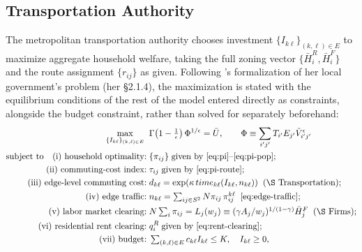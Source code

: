 \documentclass[12pt, a4paper]{article}
\theoremstyle{definition}
\theoremstyle{remark}
\begin{document}
\subsection{Transportation Authority}

The metropolitan transportation authority chooses investment $\{I_{k\ell}\}_{(k,\ell) \in E}$ to maximize aggregate household welfare, taking the full zoning vector $\{\bar{H}_i^R, \bar{H}_i^F\}$ and the route assignment $\{r_{ij}\}$ as given. Following \citet{Bordeu2026-df}'s formalization of her local government's problem (her \S2.1.4), the maximization is stated with the equilibrium conditions of the rest of the model entered directly as constraints, alongside the budget constraint, rather than solved for separately beforehand:
\begin{align}
    \label{eq:TA-problem}
\max_{\{I_{k\ell}\}_{(k,\ell)\in E}}\;\; & \Gamma\!\left(1 - \tfrac{1}{\epsilon}\right)\Phi^{1/\epsilon} = \bar U, \qquad \Phi\equiv\sum_{i'j'}T_{i'}E_{j'}\tilde V_{i'j'}^\epsilon \\
\text{subject to} \quad
\text{(i) household optimality:}\; & \{\pi_{ij}\}\; \text{given by \eqref{eq:pi}--\eqref{eq:pi-pop};} \nonumber\\
\text{(ii) commuting-cost index:}\; & \tau_{ij} \;\text{given by \eqref{eq:pi-route};} \nonumber\\
\text{(iii) edge-level commuting cost:}\; & d_{k\ell} = \exp(\kappa\,time_{k\ell}(I_{k\ell},n_{k\ell})) \;\;(\text{\S Transportation}); \nonumber\\
\text{(iv) edge traffic:}\; & n_{k\ell} = \textstyle\sum_{ij\in S^2} N\pi_{ij}\,\pi_{ij}^{k\ell} \;\;\eqref{eq:edge-traffic}; \nonumber\\
\text{(v) labor market clearing:}\; & N\textstyle\sum_i \pi_{ij} = L_j(w_j)\equiv(\gamma A_j/w_j)^{1/(1-\gamma)}\bar H_j^F \;\;(\text{\S Firms}); \nonumber\\
\text{(vi) residential rent clearing:}\; & q_i^R \;\text{given by \eqref{eq:rent-clearing}}; \nonumber\\
\text{(vii) budget:}\; & \textstyle\sum_{(k,\ell)\in E}c_{k\ell}I_{k\ell}\leq K, \quad I_{k\ell}\geq0, \nonumber
\end{align}
\end{document}
